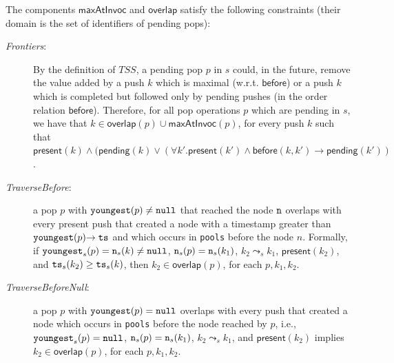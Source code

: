 The components $\mathsf{maxAtInvoc}$ and $\mathsf{overlap}$ satisfy the following constraints (their domain is the set of identifiers of pending pops):
\vspace{-1mm}
\begin{description}
\item[\emph{Frontiers}:] By the definition of $TSS$, a pending pop $p$ in $s$ could, in the future, remove the value added by a push $k$ which is maximal (w.r.t. $\mathsf{before}$) or a push $k$ which is completed but followed only by pending pushes (in the order relation $\mathsf{before}$). Therefore, for all pop operations $p$ which are pending in $s$, we have that $k \in \mathsf{overlap}(p) \cup \mathsf{maxAtInvoc}(p)$, for every push $k$ such that $\mathsf{present}(k) \land (\mathsf{pending}(k) \lor (\forall k'. \mathsf{present}(k') \land \mathsf{before}(k,k') \rightarrow \mathsf{pending}(k'))$.
	\item[\emph{TraverseBefore}:] a pop $p$ with ${\tt youngest}(p)\neq {\tt null}$ that reached the node ${\tt n}$ overlaps with every present push that created a node with a timestamp greater than ${\tt youngest}(p){\tt ->ts}$ and which occurs in  {\tt pools} before the node $n$. Formally, if ${\tt youngest}_s(p)= {\tt n}_s(k) \neq{\tt null}$, ${\tt n}_s(p)={\tt n}_s(k_1)$, $k_2\leadsto_s k_1$, $\mathsf{present}(k_2)$, and ${\tt ts}_s(k_2) \geq {\tt ts}_s(k)$, then $k_2\in \mathsf{overlap}(p)$, for each $p, k_1, k_2$.
	\item[\emph{TraverseBeforeNull}:] a pop $p$ with ${\tt youngest}(p)={\tt null}$ overlaps with every push that created a node which occurs in {\tt pools} before the node reached by $p$,
i.e., ${\tt youngest}_s(p)={\tt null}$, ${\tt n}_s(p)={\tt n}_s(k_1)$, $k_2\leadsto_s k_1$, and $\mathsf{present}(k_2)$ implies $k_2\in \mathsf{overlap}(p)$, for each $p, k_1, k_2$.

\end{description}
